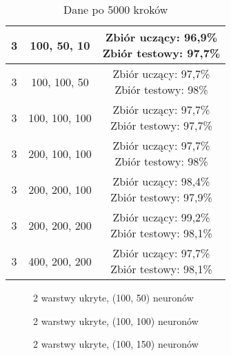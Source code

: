 \begin{table}[h]
\begin{tabular}{|c|c|c|}
3 & 100, 50, 10 & \makecell{Zbiór uczący: 96,9\% \\ Zbiór testowy: 97,7\%} \\ \hline
3 & 100, 100, 50 & \makecell{Zbiór uczący: 97,7\% \\ Zbiór testowy: 98\%} \\ \hline
3 & 100, 100, 100 & \makecell{Zbiór uczący: 97,7\% \\ Zbiór testowy: 97,7\%} \\ \hline
3 & 200, 100, 100 & \makecell{Zbiór uczący: 97,7\% \\ Zbiór testowy: 98\%} \\ \hline
3 & 200, 200, 100 & \makecell{Zbiór uczący: 98,4\% \\ Zbiór testowy: 97,9\%} \\ \hline
3 & 200, 200, 200 & \makecell{Zbiór uczący: 99,2\% \\ Zbiór testowy: 98,1\%} \\ \hline
3 & 400, 200, 200 & \makecell{Zbiór uczący: 97,7\% \\ Zbiór testowy: 98,1\%} \\ \hline
\end{tabular}
\caption{Dane po 5000 kroków}
\label{table:struktura}
\end{table}

\begin{figure}
\centering
{}
\caption{2 warstwy ukryte, (100, 50) neuronów}
\label{fig:w_2_n_100_50}
\end{figure}

\begin{figure}
\centering
{}
\caption{2 warstwy ukryte, (100, 100) neuronów}
\label{fig:w_2_n_100_100}
\end{figure}

\begin{figure}
\centering
{}
\caption{2 warstwy ukryte, (100, 150) neuronów}
\label{fig:w_2_n_100_150}
\end{figure}

